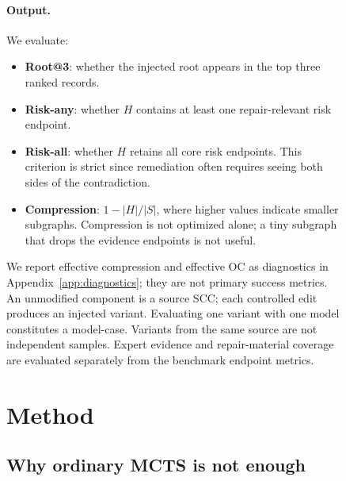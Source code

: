 \documentclass[11pt]{article}
\makeatletter
\newcommand{\riskany}{Risk-any}
\newcommand{\riskall}{Risk-all}
\newcommand{\rootthree}{Root@3}
\newcommand{\scc}{SCC}
\newcommand{\oc}{OC}
\makeatother
\begin{document}
\begin{figure}[!t]
\paragraph{Output.}
  We evaluate:
\begin{itemize}[leftmargin=*,itemsep=2pt]
    \item \textbf{\rootthree{}}: whether the injected root appears in the top three ranked records.
    \item \textbf{\riskany{}}: whether $H$ contains at least one repair-relevant risk endpoint.
    \item \textbf{\riskall{}}: whether $H$ retains all core risk endpoints.  This criterion is strict since remediation often requires seeing both sides of the contradiction.
    \item \textbf{Compression}: $1-|H|/|S|$, where higher values indicate smaller subgraphs.  Compression is not optimized alone; a tiny subgraph that drops the evidence endpoints is not useful.
\end{itemize}
We report effective compression and effective \oc{} as diagnostics in Appendix~\ref{app:diagnostics}; they are not primary success metrics.
An unmodified component is a source \scc{}; each controlled edit produces an injected variant. Evaluating one variant with one model constitutes a model-case. Variants from the same source are not independent samples. Expert evidence and repair-material coverage are evaluated separately from the benchmark endpoint metrics.

\section{Method}
\label{sec:method}

\subsection{Why ordinary MCTS is not enough}
\label{sec:mcts_motivation}


\end{figure}
\end{document}
